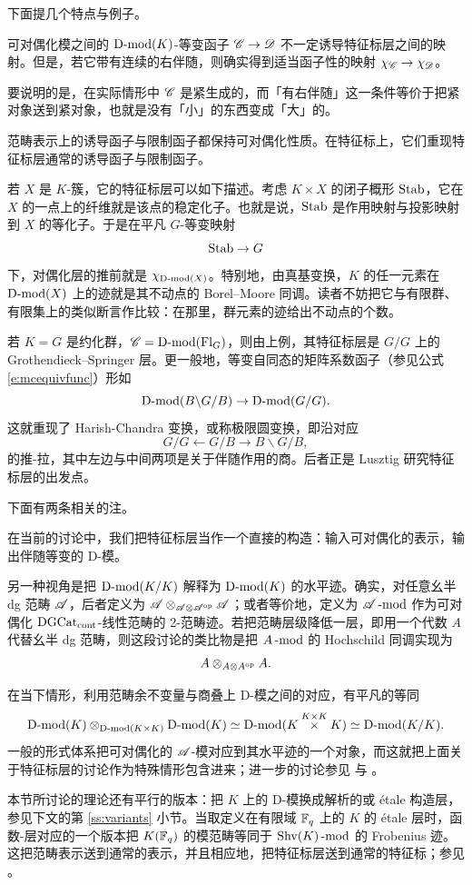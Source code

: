 \ssszh 下面提几个特点与例子。

\begin{ex} 可对偶化模之间的 $\Dmod(K)$-等变函子
$\sC \rightarrow \sD$
不一定诱导特征标层之间的映射。但是，若它带有连续的右伴随，则确实得到适当函子性的映射 $\chi_\sC
\rightarrow
\chi_{\sD}$。

要说明的是，在实际情形中 $\sC$ 是紧生成的，而「有右伴随」这一条件等价于把紧对象送到紧对象，也就是没有「小」的东西变成「大」的。
\end{ex}

\begin{ex} 范畴表示上的诱导函子与限制函子都保持可对偶化性质。在特征标上，它们重现特征标层通常的诱导函子与限制函子。
\end{ex}

\begin{ex} 若 $X$ 是 $K$-簇，它的特征标层可以如下描述。考虑 $K \times X$ 的闭子概形 $\on{Stab}$，它在 $X$ 的一点上的纤维就是该点的稳定化子。也就是说，$\on{Stab}$ 是作用映射与投影映射到 $X$ 的等化子。于是在平凡 $G$-等变映射
%
\[
\on{Stab} \rightarrow G
\]
%
下，对偶化层的推前就是 $\chi_{\Dmod(X)}$。特别地，由真基变换，$K$ 的任一元素在 $\Dmod(X)$ 上的迹就是其不动点的 Borel--Moore 同调。读者不妨把它与有限群、有限集上的类似断言作比较：在那里，群元素的迹给出不动点的个数。
\end{ex}

\begin{ex} 若 $K=G$ 是约化群，$\sC = \Dmod(\sB)$，则由上例，其特征标层是 $G/G$ 上的 Grothendieck--Springer 层。更一般地，等变自同态的矩阵系数函子（参见公式 \eqref{e:mcequivfunc}）形如
%
\[  \Dmod(B \backslash G / B) \rightarrow \Dmod(G/G).\]
%
这就重现了 Harish-Chandra 变换，或称极限圆变换，即沿对应 $$G/G \leftarrow G/B \rightarrow B \backslash G / B,$$ 的推-拉，其中左边与中间两项是关于伴随作用的商。后者正是 Lusztig 研究特征标层的出发点。
\end{ex}

下面有两条相关的注。

\begin{re}在当前的讨论中，我们把特征标层当作一个直接的构造：输入可对偶化的表示，输出伴随等变的 D-模。

另一种视角是把 $\Dmod(K/K)$ 解释为 $\Dmod(K)$ 的水平迹。确实，对任意幺半 dg 范畴 $\sA$，后者定义为 $\sA \otimes_{\sA \otimes \sA^{\on{op}}} \sA$；或者等价地，定义为 $\sA\mod$ 作为可对偶化 $\DGCat$-线性范畴的 2-范畴迹。若把范畴层级降低一层，即用一个代数 $A$ 代替幺半 dg 范畴，则这段讨论的类比物是把 $A\mod$ 的 Hochschild 同调实现为
%
\[
  A \otimes_{A \otimes A^{\on{op}}} A.
\]
%

在当下情形，利用范畴余不变量与商叠上 D-模之间的对应，有平凡的等同
%
\[
   \Dmod(K) \otimes_{\Dmod(K \times K)} \Dmod(K) \simeq \Dmod(K
   \overset{K \times K} \times K) \simeq \Dmod(K / K).
\]
%
一般的形式体系把可对偶化的 $\sA$-模对应到其水平迹的一个对象，而这就把上面关于特征标层的讨论作为特殊情形包含进来；进一步的讨论参见 \cite{gkrvtoyshtuka} 与 \cite{bznadlerchartheory}。
\end{re}

\begin{re}本节所讨论的理论还有平行的版本：把 $K$ 上的 D-模换成解析的或 \'etale 构造层，参见下文的第 \ref{ss:variants} 小节。当取定义在有限域 $\Fq$ 上的 $K$ 的 \'etale 层时，函数-层对应的一个版本把 $K(\Fq)$ 的模范畴等同于 $\on{Shv}(K)\mod$ 的 Frobenius 迹。这把范畴表示送到通常的表示，并且相应地，把特征标层送到通常的特征标；参见 \cite{Gaitsgoryinventshtukas}。
\end{re}

